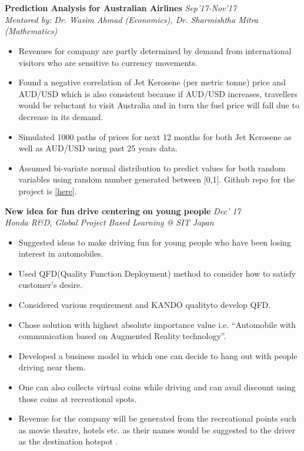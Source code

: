 \documentclass[margin]{res}
\begin{document}
\begin{resume}
\begin{itemize}
\\
\\
\end{itemize}
\textbf{Prediction Analysis for Australian Airlines} \hfill \textit{Sep’17-Nov’17}\\
\textit{Mentored by: Dr. Wasim Ahmad (Economics), Dr. Sharmishtha Mitra (Mathematics)}
\begin{itemize}
\item Revenues for company are partly determined by demand from international visitors who are sensitive to 
currency movements.
\item Found a negative correlation of Jet Kerosene (per metric tonne) price and AUD/USD which is also consistent because if AUD/USD increases, travellers would be reluctant to visit Australia and in turn the fuel price will fall due to decrease in its demand.
\item Simulated 1000 paths of prices for next 12 months for both Jet Kerosene as well as AUD/USD using past 25 years data.
\item Assumed bi-variate normal distribution to predict values for both random variables using random number generated between [0,1]. Github repo for the project is \href{https://github.com/bhavykhatri/prediction-analysis-for-australian-airlines}{[here]}.
\end{itemize}
\textbf{New idea for fun drive centering on young people} \hfill \textit{Dec’ 17}\\
\textit{Honda R\&D, Global Project Based Learning @ SIT Japan}
\begin{itemize}
\item Suggested ideas to make driving fun for young people who have been losing interest in automobiles.
\item Used QFD(Quality Function Deployment) method to consider how to satisfy customer’s desire.
\item Considered various requirement and KANDO qualityto develop QFD.
\item Chose solution with highest absolute importance value i.e. “Automobile with communication based on Augmented Reality technology”.
\item Developed a business model in which one can decide to hang out with people driving near them.
\item One can also collects virtual coins while driving and can avail discount using those coins at recreational spots.
\item Revenue for the company will be generated from the recreational points such as movie theatre, hotels etc. as their names would be suggested to the driver as the destination hotspot .
\end{itemize}


\end{resume}
\end{document}
